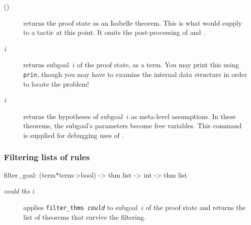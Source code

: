\begin{description}
\item[()]  
returns the proof state as an Isabelle theorem.  This is what 
would supply to a tactic at this point.  It omits the post-processing of
 and .

\item[ {\it i}]  
returns subgoal~$i$ of the proof state, as a term.  You may print
this using {\tt prin}, though you may have to examine the internal
data structure in order to locate the problem!

\item[ {\it i}]  
returns the hypotheses of subgoal~$i$ as meta-level assumptions.  In these
theorems, the subgoal's parameters become free variables.  This command is
supplied for debugging uses of .
\end{description}

\subsubsection{Filtering lists of rules}
\begin{ttbox} 
filter_goal: (term*term->bool) -> thm list -> int -> thm list
\end{ttbox}

\begin{description}
\item[ {\it could} {\it ths} {\it i}] 
applies \hbox{\tt filter_thms {\it could}} to subgoal~$i$ of the proof
state and returns the list of theorems that survive the filtering. 
\end{description}

